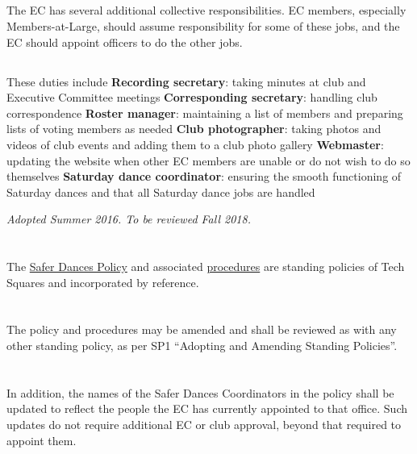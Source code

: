 \documentclass{bylaws}
\newcommand{\sptimes}[2]{\emph{Adopted #1. To be reviewed #2.}}
\begin{document}
\subsection{}The EC has several additional collective responsibilities. EC members, especially Members-at-Large, should assume responsibility for some of these jobs, and the EC should appoint officers to do the other jobs.
\subsection{}These duties include
\duty \textbf{Recording secretary}: taking minutes at club and Executive Committee meetings
\duty \textbf{Corresponding secretary}: handling club correspondence
\duty \textbf{Roster manager}: maintaining a list of members and preparing lists of voting members as needed
\duty \textbf{Club photographer}: taking photos and videos of club events and adding them to a club photo gallery
\duty \textbf{Webmaster}: updating the website when other EC members are unable or do not wish to do so themselves
\duty \textbf{Saturday dance coordinator}: ensuring the smooth functioning of Saturday dances and that all Saturday dance jobs are handled

\label{pol:safer}
\sptimes{Summer 2016}{Fall 2018}

\section{} The \href{safer-dances.html}{Safer Dances Policy} and associated \href{safer-dances-procedures.html}{procedures} are standing policies of Tech Squares and incorporated by reference.
\section{} The policy and procedures may be amended and shall be reviewed as with any other standing policy, as per SP1 ``Adopting and Amending Standing Policies''.
\section{} In addition, the names of the Safer Dances Coordinators in the policy shall be updated to reflect the people the EC has currently appointed to that office. Such updates do not require additional EC or club approval, beyond that required to appoint them.
\end{document}
